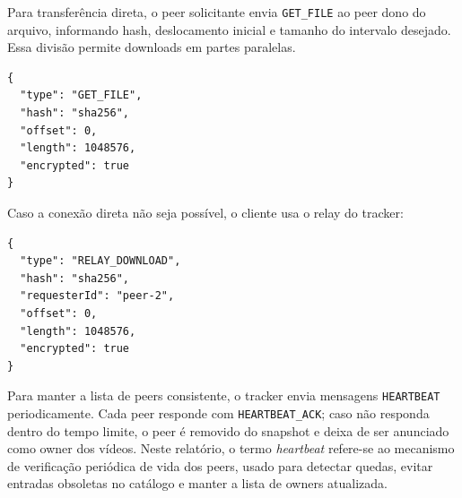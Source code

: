 \documentclass[
	12pt,
	oneside,
	a4paper,
	chapter=TITLE,
	section=TITLE,
	english,
	brazilian,
	sumario=tradicional
]{abntex2}
\begin{document}
Para transferência direta, o peer solicitante envia \texttt{GET\_FILE} ao peer dono do arquivo, informando hash, deslocamento inicial e tamanho do intervalo desejado. Essa divisão permite downloads em partes paralelas.

\begin{lstlisting}[caption={Solicitação de intervalo de arquivo a um peer.}, label={lst:getfile}]
{
  "type": "GET_FILE",
  "hash": "sha256",
  "offset": 0,
  "length": 1048576,
  "encrypted": true
}
\end{lstlisting}

Caso a conexão direta não seja possível, o cliente usa o relay do tracker:

\begin{lstlisting}[caption={Solicitação de relay ao tracker.}, label={lst:relay}]
{
  "type": "RELAY_DOWNLOAD",
  "hash": "sha256",
  "requesterId": "peer-2",
  "offset": 0,
  "length": 1048576,
  "encrypted": true
}
\end{lstlisting}

Para manter a lista de peers consistente, o tracker envia mensagens \texttt{HEARTBEAT} periodicamente. Cada peer responde com \texttt{HEARTBEAT\_ACK}; caso não responda dentro do tempo limite, o peer é removido do snapshot e deixa de ser anunciado como owner dos vídeos. Neste relatório, o termo \textit{heartbeat} refere-se ao mecanismo de verificação periódica de vida dos peers, usado para detectar quedas, evitar entradas obsoletas no catálogo e manter a lista de owners atualizada.
\end{document}
